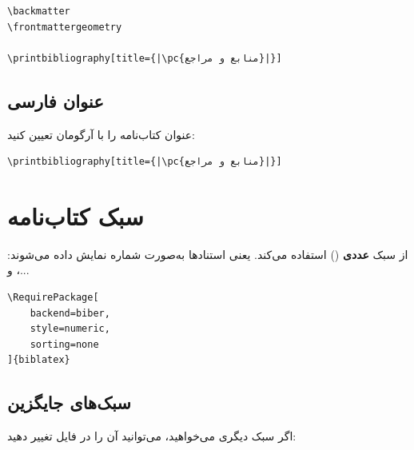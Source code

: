 \begin{latin}
\begin{verbatim}
\backmatter
\frontmattergeometry

\printbibliography[title={|\pc{منابع و مراجع}|}]
\end{verbatim}
\end{latin}


\subsection{عنوان فارسی}
\label{sec:bibliography-persian-title}

عنوان کتاب‌نامه را با آرگومان  تعیین
کنید:

\begin{latin}
\begin{verbatim}
\printbibliography[title={|\pc{منابع و مراجع}|}]
\end{verbatim}
\end{latin}


\section{سبک کتاب‌نامه}
\label{sec:bibliography-style}

 از سبک \textbf{عددی} ()
استفاده می‌کند. یعنی استنادها به‌صورت شماره
نمایش داده می‌شوند: \lr{[1]}، \lr{[2]} و...

\begin{latin}
\begin{verbatim}
\RequirePackage[
    backend=biber,
    style=numeric,
    sorting=none
]{biblatex}
\end{verbatim}
\end{latin}


\subsection{سبک‌های جایگزین}
\label{sec:bibliography-alternative-styles}

اگر سبک دیگری می‌خواهید، می‌توانید آن را در
فایل  تغییر دهید:

